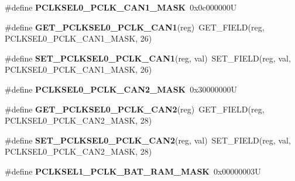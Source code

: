 \begin{DoxyCompactItemize}
\mbox{\label{group__lpc24xx__regs_ga7b08b0d9b52dbb5a2c9e6518ce68a4c5}} 
\#define {\bfseries P\+C\+L\+K\+S\+E\+L0\+\_\+\+P\+C\+L\+K\+\_\+\+C\+A\+N1\+\_\+\+M\+A\+SK}~0x0c000000U
\item 
\mbox{\label{group__lpc24xx__regs_ga736b0ff475fe2d27dbaa02f9f2ee711c}} 
\#define {\bfseries G\+E\+T\+\_\+\+P\+C\+L\+K\+S\+E\+L0\+\_\+\+P\+C\+L\+K\+\_\+\+C\+A\+N1}(reg)~G\+E\+T\+\_\+\+F\+I\+E\+LD(reg, P\+C\+L\+K\+S\+E\+L0\+\_\+\+P\+C\+L\+K\+\_\+\+C\+A\+N1\+\_\+\+M\+A\+SK, 26)
\item 
\mbox{\label{group__lpc24xx__regs_ga13075e081bb22b6f56519fd92919f737}} 
\#define {\bfseries S\+E\+T\+\_\+\+P\+C\+L\+K\+S\+E\+L0\+\_\+\+P\+C\+L\+K\+\_\+\+C\+A\+N1}(reg,  val)~S\+E\+T\+\_\+\+F\+I\+E\+LD(reg, val, P\+C\+L\+K\+S\+E\+L0\+\_\+\+P\+C\+L\+K\+\_\+\+C\+A\+N1\+\_\+\+M\+A\+SK, 26)
\item 
\mbox{\label{group__lpc24xx__regs_ga8d871cd2848deec4a9ca9d960275ee65}} 
\#define {\bfseries P\+C\+L\+K\+S\+E\+L0\+\_\+\+P\+C\+L\+K\+\_\+\+C\+A\+N2\+\_\+\+M\+A\+SK}~0x30000000U
\item 
\mbox{\label{group__lpc24xx__regs_gacd4567e0407ed1b7691e95547ef2485f}} 
\#define {\bfseries G\+E\+T\+\_\+\+P\+C\+L\+K\+S\+E\+L0\+\_\+\+P\+C\+L\+K\+\_\+\+C\+A\+N2}(reg)~G\+E\+T\+\_\+\+F\+I\+E\+LD(reg, P\+C\+L\+K\+S\+E\+L0\+\_\+\+P\+C\+L\+K\+\_\+\+C\+A\+N2\+\_\+\+M\+A\+SK, 28)
\item 
\mbox{\label{group__lpc24xx__regs_ga352ff71b9bd4ef05e7998c2f1c67f6c9}} 
\#define {\bfseries S\+E\+T\+\_\+\+P\+C\+L\+K\+S\+E\+L0\+\_\+\+P\+C\+L\+K\+\_\+\+C\+A\+N2}(reg,  val)~S\+E\+T\+\_\+\+F\+I\+E\+LD(reg, val, P\+C\+L\+K\+S\+E\+L0\+\_\+\+P\+C\+L\+K\+\_\+\+C\+A\+N2\+\_\+\+M\+A\+SK, 28)
\item 
\mbox{\label{group__lpc24xx__regs_ga48aa08fdf957f83d01f860fe727af4f4}} 
\#define {\bfseries P\+C\+L\+K\+S\+E\+L1\+\_\+\+P\+C\+L\+K\+\_\+\+B\+A\+T\+\_\+\+R\+A\+M\+\_\+\+M\+A\+SK}~0x00000003U
\item 
\mbox{\label{group__lpc24xx__regs_ga7cbec5d9d99ece3ed4158a7ea90e7780}} 

\end{DoxyCompactItemize}
